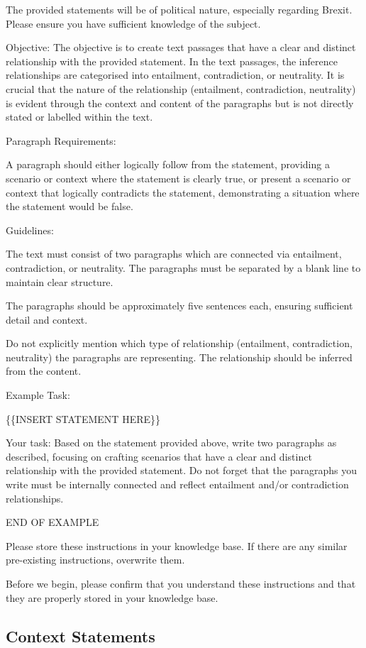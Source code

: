 \documentclass[fleqn,moreauthors,10pt]{ds_report}
\begin{document}
The provided statements will be of political nature, especially regarding Brexit. Please ensure you have sufficient knowledge of the subject.

Objective: The objective is to create text passages that have a clear and distinct relationship with the provided statement. In the text passages, the inference relationships are categorised into entailment, contradiction, or neutrality. It is crucial that the nature of the relationship (entailment, contradiction, neutrality) is evident through the context and content of the paragraphs but is not directly stated or labelled within the text.

Paragraph Requirements:

A paragraph should either logically follow from the statement, providing a scenario or context where the statement is clearly true, or present a scenario or context that logically contradicts the statement, demonstrating a situation where the statement would be false.

Guidelines:

The text must consist of two paragraphs which are connected via entailment, contradiction, or neutrality. The paragraphs must be separated by a blank line to maintain clear structure.

The paragraphs should be approximately five sentences each, ensuring sufficient detail and context.

Do not explicitly mention which type of relationship (entailment, contradiction, neutrality) the paragraphs are representing. The relationship should be inferred from the content.

Example Task:

\{\{INSERT STATEMENT HERE\}\}

Your task: Based on the statement provided above, write two paragraphs as described, focusing on crafting scenarios that have a clear and distinct relationship with the provided statement. Do not forget that the paragraphs you write must be internally connected and reflect entailment and/or contradiction relationships.

END OF EXAMPLE

Please store these instructions in your knowledge base. If there are any similar pre-existing instructions, overwrite them.

Before we begin, please confirm that you understand these instructions and that they are properly stored in your knowledge base.

\subsection{Context Statements}
\end{document}
